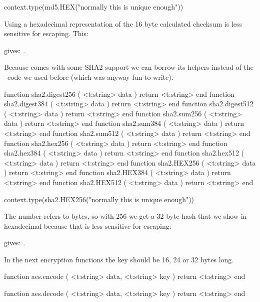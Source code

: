 \startbuffer
\startluacode
context.type(md5.HEX("normally this is unique enough"))
\stopluacode
\stopbuffer

Using a hexadecimal representation of the 16 byte calculated checksum is less
sensitive for escaping. This:

\typebuffer

gives: \inlinebuffer.

\stopsubsection

\startsubsection[title=SHA2 hashing]

Because  comes with some SHA2 support we can borrow its helpers
instead of the \LUA\ code we used before (which was anyway fun to write).

\starttyping[option=LUA]
function sha2.digest256 ( <t:string> data ) return <t:string> end
function sha2.digest384 ( <t:string> data ) return <t:string> end
function sha2.digest512 ( <t:string> data ) return <t:string> end
function sha2.sum256    ( <t:string> data ) return <t:string> end
function sha2.sum384    ( <t:string> data ) return <t:string> end
function sha2.sum512    ( <t:string> data ) return <t:string> end
function sha2.hex256    ( <t:string> data ) return <t:string> end
function sha2.hex384    ( <t:string> data ) return <t:string> end
function sha2.hex512    ( <t:string> data ) return <t:string> end
function sha2.HEX256    ( <t:string> data ) return <t:string> end
function sha2.HEX384    ( <t:string> data ) return <t:string> end
function sha2.HEX512    ( <t:string> data ) return <t:string> end
\stoptyping

\startbuffer
\startluacode
context.type(sha2.HEX256("normally this is unique enough"))
\stopluacode
\stopbuffer

The number refers to bytes, so with 256 we get a 32 byte hash that we show in
hexadecimal because that is less sensitive for escaping:

\typebuffer

gives: \inlinebuffer.

\stopsubsection

\startsubsection[title=AES encryption]

In the next encryption functions the key should be 16, 24 or 32 bytes long.

\starttyping[option=LUA]
function aes.encode (
    <t:string> data,
    <t:string> key
)
    return <t:string>
end

function aes.decode (
    <t:string> data,
    <t:string> key
)
    return <t:string>
end
\stoptyping

